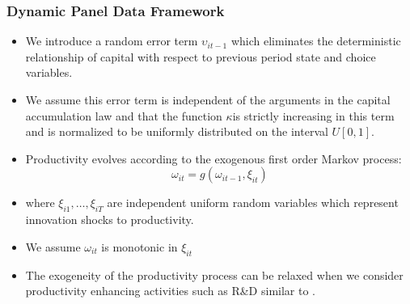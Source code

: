 \documentclass{beamer}
\begin{document}

\begin{frame}
\frametitle{Dynamic Panel Data Framework}
\begin{itemize}
	\item We introduce a random error term $\upsilon_{it-1}$ which eliminates the deterministic relationship of capital with respect to previous period state and choice variables. 
	\item  We assume this error term is independent of the arguments in the capital accumulation law and that the function $\kappa$is strictly increasing in this term and is normalized to be uniformly distributed on the interval $U[0,1]$. 
	\item Productivity evolves according to the exogenous first order Markov process:
		\begin{equation}\label{modelw}
		\omega_{it}=g(\omega_{it-1}, \xi_{it})
		\end{equation}
		\item where $\xi_{i1},\dots, \xi_{iT}$ are independent uniform random variables which represent innovation shocks to productivity. 
		\item We assume $\omega_{it}$ is monotonic in $\xi_{it}$
		\item The exogeneity of the productivity process can be relaxed when we consider productivity enhancing activities such as R\&D similar to \cite{Doraszelski2013}.
	\end{itemize}
\end{frame}

\end{document}
